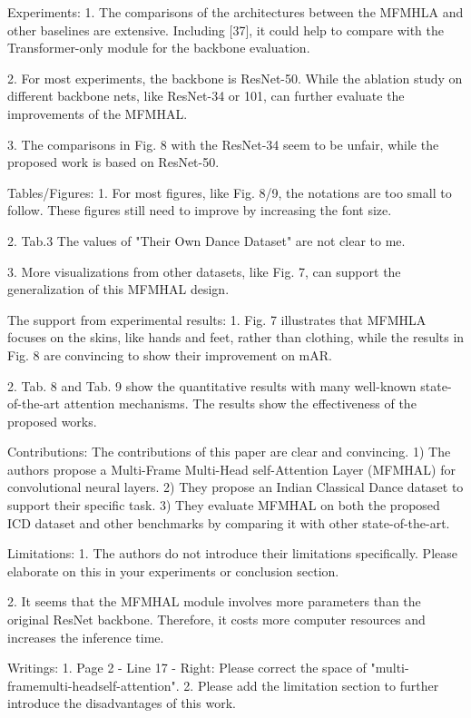 Experiments: 
1. The comparisons of the architectures between the MFMHLA and other baselines are extensive. Including [37], it could help to compare with the Transformer-only module for the backbone evaluation.

2. For most experiments, the backbone is ResNet-50. While the ablation study on different backbone nets, like ResNet-34 or 101, can further evaluate the improvements of the MFMHAL.

3. The comparisons in Fig. 8 with the ResNet-34 seem to be unfair, while the proposed work is based on ResNet-50.

Tables/Figures: 
1. For most figures, like Fig. 8/9, the notations are too small to follow. These figures still need to improve by increasing the font size.

2. Tab.3 The values of "Their Own Dance Dataset" are not clear to me.

3. More visualizations from other datasets, like Fig. 7, can support the generalization of this MFMHAL design.

The support from experimental results:
1. Fig. 7 illustrates that MFMHLA focuses on the skins, like hands and feet, rather than clothing, while the results in Fig. 8 are convincing to show their improvement on mAR.

2. Tab. 8 and Tab. 9 show the quantitative results with many well-known state-of-the-art attention mechanisms. The results show the effectiveness of the proposed works.

Contributions:
The contributions of this paper are clear and convincing. 1) The authors propose a Multi-Frame Multi-Head self-Attention Layer (MFMHAL) for convolutional neural layers. 2) They propose an Indian Classical Dance dataset to support their specific task. 3) They evaluate MFMHAL on both the proposed ICD dataset and other benchmarks by comparing it with other state-of-the-art.

Limitations: 
1. The authors do not introduce their limitations specifically. Please elaborate on this in your experiments or conclusion section.

2. It seems that the MFMHAL module involves more parameters than the original ResNet backbone. Therefore, it costs more computer resources and increases the inference time. 

Writings: 
1. Page 2 - Line 17 - Right: Please correct the space of "multi-framemulti-headself-attention".
2. Please add the limitation section to further introduce the disadvantages of this work.






